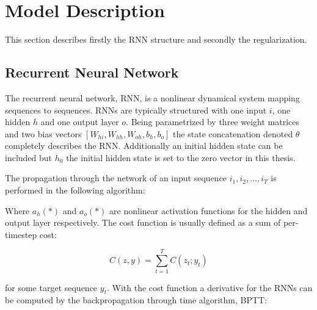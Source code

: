 \chapter{Model Description}

This section describes firstly the RNN structure and secondly the regularization.

\section{Recurrent Neural Network}

The recurrent neural network, RNN, is a nonlinear dynamical system mapping sequences to sequences. RNNs are typically structured with one input $i$, one hidden $h$ and one output layer $o$. Being parametrized by three weight matrices and two bias vectors \([W_{hi}, W_{hh}, W_{oh}, b_h, b_o]\) the state concatenation denoted \(\theta\) completely describes the RNN. Additionally an initial hidden state can be included but $h_0$ the initial hidden state is set to the zero vector in this thesis.

The propagation through the network of an input sequence \(i_1, i_2, ... , i_T\) is performed in the following algorithm:

\begin{algorithmic}[1]
    \EndFor
\end{algorithmic}

Where $ a_h(*)$ and $a_o(*)$ are nonlinear activation functions for the hidden and output layer respectively. The cost function is usually defined as a sum of per-timestep cost:

\[C(z, y) = \sum_{t=1}^{T}C(z_t; y_t)\]

for some target sequence $y_t$. With the cost function a derivative for the RNNs can be computed by the backpropagation through time algorithm, BPTT:

\begin{algorithmic}[1]
    \EndFor
    \State {}
\end{algorithmic}

